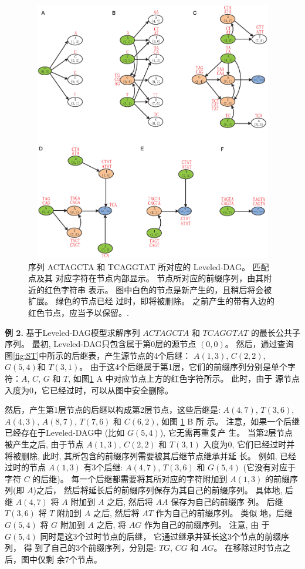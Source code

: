 \begin{figure}[!h]
  \centering
  \includegraphics[height=4.5in, width=4.5in]{figures/4_MLCS/Level_DAG}
  \caption{序列 ACTAGCTA 和 TCAGGTAT 所对应的 Leveled-DAG。 匹配点及其
    对应字符在节点内部显示。 节点所对应的前缀序列，由其附近的红色字符串
    表示。 图中白色的节点是新产生的，且稍后将会被扩展。 绿色的节点已经
    过时，即将被删除。 之前产生的带有入边的红色节点，应当予以保留。.}
  \label{fig:Leveled-DAG}
\end{figure}

\textbf{例 2.} 基于Leveled-DAG模型求解序列 $ACTAGCTA$ 和 $TCAGGTAT$ 的最长公共子
序列。 最初, Leveled-DAG只包含属于第0层的源节点 $(0, 0)$。 然后，通过查询
图\ref{fig:ST}中所示的后继表，产生源节点的4个后继： $A(1, 3)$, $C(2, 2)$, $G(5,
4)$和 $T(3, 1)$。 由于这4个后继属于第1层，它们的前缀序列分别是单个字符：$A$, $C$,
$G$ 和 $T$, 如图\ref{fig:Leveled-DAG} A 中对应节点上方的红色字符所示。 此时，由于
源节点入度为0，它已经过时，可以从图中安全删除。

然后，产生第1层节点的后继以构成第2层节点，这些后继是: $A(4, 7)$, $T(3, 6)$,
$A(4, 3)$, $A(8, 7)$, $T(7, 6)$ 和 $C(6, 2)$, 如图 \ref{fig:Leveled-DAG} B 所
示。 注意，如果一个后继已经存在于Leveled-DAG中 (比如 $G(5, 4)$), 它无需再重复产
生。 当第2层节点被产生之后, 由于节点 $A(1, 3)$, $C(2, 2)$ 和 $T(3, 1)$ 入度为0,
它们已经过时并将被删除, 此时, 其所包含的前缀序列需要被其后继节点继承并延
长。 例如, 已经过时的节点 $A(1, 3)$ 有3个后继: $A(4, 7)$, $T(3, 6)$ 和 $G(5, 4)$
(它没有对应于字符 $C$ 的后继)。 每一个后继都需要将其所对应的字符附加到 $A(1, 3)$
的前缀序列(即 $A$)之后， 然后将延长后的前缀序列保存为其自己的前缀序列。 具体地,
后继 $A(4, 7)$ 将 $A$ 附加到 $A$ 之后, 然后将 $AA$ 保存为自己的前缀序
列。 后继 $T(3, 6)$ 将 $T$ 附加到 $A$ 之后, 然后将 $AT$ 作为自己的前缀序列。 类似
地，后继 $G(5, 4)$ 将 $G$ 附加到 $A$ 之后, 将 $AG$ 作为自己的前缀序列。 注意, 由
于 $G(5, 4)$ 同时是这3个过时节点的后继， 它通过继承并延长这3个节点的前缀序列， 得
到了自己的3个前缀序列，分别是: $TG$, $CG$ 和 $AG$。 在移除过时节点之后，图中仅剩
余7个节点。


